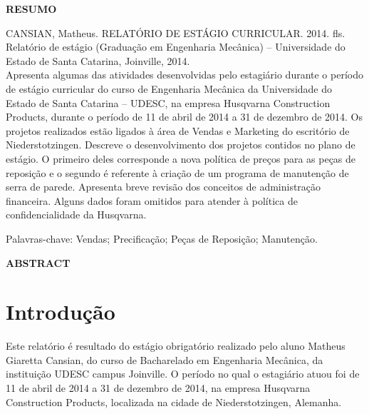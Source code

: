 \documentclass[12pt]{article}
\begin{document}
\onehalfspacing

\tableofcontents
\pagebreak

\listoffigures
\pagebreak

{
	\noindent
	
	\begin{center}
	{
		\bf RESUMO
	}\\[3cm]
	\end{center} 
	
	{
CANSIAN, Matheus. RELATÓRIO DE ESTÁGIO CURRICULAR. 2014. \pageref{LastPage} fls. Relatório de estágio (Graduação em Engenharia Mecânica) – Universidade do Estado de Santa Catarina, Joinville, 2014. 
	}\\[2cm]

	
Apresenta algumas das atividades desenvolvidas pelo estagiário durante o período de estágio curricular do curso de Engenharia Mecânica da Universidade do Estado de Santa Catarina – UDESC, na empresa Husqvarna Construction Products, durante o período de 11 de abril de 2014 a 31 de dezembro de 2014. Os projetos realizados estão ligados à área de Vendas e Marketing do escritório de Niederstotzingen. Descreve o desenvolvimento dos projetos contidos no plano de estágio. O primeiro deles corresponde a nova política de preços para as peças de reposição e o segundo é referente à criação de um programa de manutenção de serra de parede. Apresenta breve revisão dos conceitos de administração financeira. Alguns dados foram omitidos para atender à política de confidencialidade da Husqvarna.
	
	\vfill

	{
Palavras-chave: Vendas; Precificação; Peças de Reposição; Manutenção.
	}
}

\pagebreak

{
	\noindent
	\begin{center}	
	{
		\bf ABSTRACT
	}
	\end{center}
}
\pagebreak


\section{Introdução}

	Este relatório é resultado do estágio obrigatório realizado pelo aluno Matheus Giaretta Cansian, do curso de Bacharelado em Engenharia Mecânica, da instituição UDESC campus Joinville.
	O período no qual o estagiário atuou foi de 11 de abril de 2014 a 31 de dezembro de 2014, na empresa Husqvarna Construction Products, localizada na cidade de Niederstotzingen, Alemanha.
\pagebreak
\end{document}
